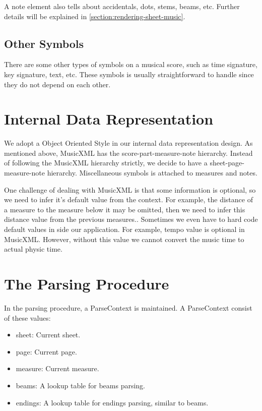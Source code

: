 A note element also tells about accidentals, dots, stems, beams, etc. Further details will be explained in \ref{section:rendering-sheet-music}.

\subsection{Other Symbols}
There are some other types of symbols on a musical score, such as time signature, key signature, text, etc. These symbols is usually straightforward to handle since they do not depend on each other.

\section{Internal Data Representation}
We adopt a Object Oriented Style in our internal data representation design. As mentioned above, MusicXML has the score-part-measure-note hierarchy. Instead of following the MusicXML hierarchy strictly, we decide to have a sheet-page-measure-note hierarchy. Miscellaneous symbols is attached to measures and notes.

One challenge of dealing with MusicXML is that some information is optional, so we need to infer it's default value from the context. For example, the distance of a measure to the measure below it may be omitted, then we need to infer this distance value from the previous measures.. Sometimes we even have to hard code default values in side our application. For example, tempo value is optional in MusicXML. However, without this value we cannot convert the music time to actual physic time.


\section{The Parsing Procedure}
In the parsing procedure, a ParseContext is maintained. A ParseContext consist of these values:
\begin{itemize}
    \item sheet: Current sheet.
    \item page: Current page.
    \item measure: Current measure.
    \item beams: A lookup table for beams parsing.
    \item endings: A lookup table for endings parsing, similar to beams.
\end{itemize}

